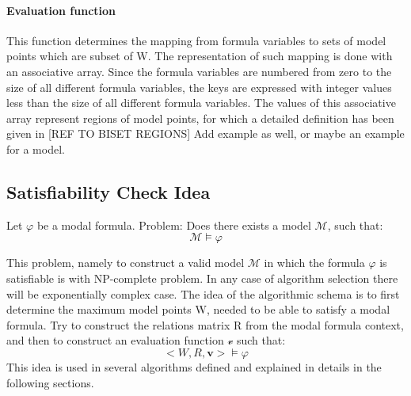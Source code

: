 \documentclass{article}
\begin{document}
		\paragraph{Evaluation function}
		\label{model-representation:evaluation-function} This function determines the mapping from formula variables to sets of model points which are subset of W.
		The representation of such mapping is done with an associative array. Since the formula variables are numbered from zero to the size
		of all different formula variables, the keys are expressed with integer values less than the size of all different formula variables.
		The values of this associative array represent regions of model points, for which a detailed definition has been given in [REF TO BISET REGIONS]
		\newline
		\newline
		Add example as well, or maybe an example for a model.

	\subsection{Satisfiability Check Idea}
		Let $\varphi$ be a modal formula.
		\newline
		\newline
		Problem: Does there exists a model $\mathcal{M}$, such that:
		\begin{equation}
			\mathcal{M} \models \varphi
		\end{equation}

		This problem, namely to construct a valid model $\mathcal{M}$ in which the formula $\varphi$ is satisfiable is with NP-complete problem.
		In any case of algorithm selection there will be exponentially complex case.
		The idea of the algorithmic schema is to first determine the maximum model points W, needed to be able to satisfy a modal formula. Try to 
		construct the relations matrix R from the modal formula context, and then to construct an evaluation function $\mathcal{v}$  such that:
		\begin{equation}
			<W, R, \boldsymbol{v}> \models \varphi
		\end{equation}
		This idea is used in several algorithms defined and explained in details in the following sections.
		

	\newpage
\end{document}
